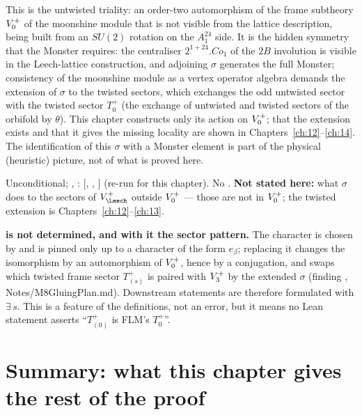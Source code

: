 \begin{physics}
This is the untwisted triality: an order-two automorphism of the frame subtheory $V_0^{+}$ of the moonshine module that is not visible from the lattice description, being built from an $SU(2)$ rotation on the $A_1^{24}$ side. It is the hidden symmetry that the Monster requires: the centraliser $2^{1+24}.Co_1$ of the $2B$ involution is visible in the Leech-lattice construction, and adjoining $\sigma$ generates the full Monster; consistency of the moonshine module as a vertex operator algebra demands the extension of $\sigma$ to the twisted sectors, which exchanges the odd untwisted sector with the twisted sector $T_0^+$ (the exchange of untwisted and twisted sectors of the orbifold by $\theta$). This chapter constructs only its action on $V_0^{+}$; that the extension exists and that it gives the missing locality are shown in Chapters~\ref{ch:12}--\ref{ch:14}. The identification of this $\sigma$ with a Monster element is part of the physical (heuristic) picture, not of what is proved here.
\end{physics}
\begin{status}Unconditional; , : [,
, ] (re-run for this chapter).  No .
\textbf{Not stated here:} what $\sigma$ does to the sectors of $V_\Leech^+$ outside $V_0^{+}$ --- those
are not in $V_0^{+}$; the twisted extension is Chapters~\ref{ch:12}--\ref{ch:13}.\end{status}

\begin{warning}
\textbf{ is not determined, and with it the sector pattern.}  The character 
is chosen by  and is pinned only up to a character of the form $e_\beta$;
replacing it changes the isomorphism  by an automorphism of $V_0^{+}$, hence
 by a conjugation, and swaps which twisted frame sector $T^+_{(s)}$ is paired with
$V_3^{+}$ by the extended $\sigma$ (finding , Notes/M8GluingPlan.md).
Downstream statements are therefore formulated with $\exists\,s$.  This is a feature of the
definitions, not an error, but it means no Lean statement asserts ``$T^+_{(0)}$ is FLM's $T_0^+$''.
\end{warning}

\section{Summary: what this chapter gives the rest of the proof}\label{ch11:sec:summary}

